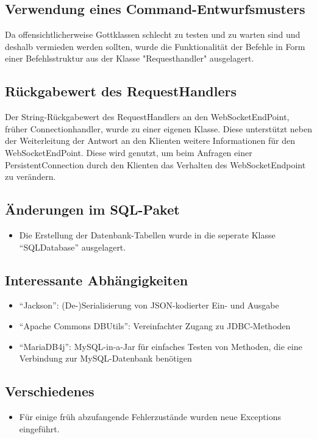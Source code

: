 \documentclass[parskip=full,11pt]{scrartcl}
\begin{document}
\subsection{Verwendung eines Command-Entwurfsmusters}
Da offensichtlicherweise Gottklassen schlecht zu testen und zu warten sind und
deshalb vermieden werden sollten, wurde die Funktionalität der Befehle in Form
einer Befehlsstruktur aus der Klasse "Requesthandler" ausgelagert.

\subsection{Rückgabewert des RequestHandlers}
Der String-Rückgabewert des RequestHandlers an den WebSocketEndPoint, früher
Connectionhandler, wurde zu einer eigenen Klasse. Diese unterstützt neben der
Weiterleitung der Antwort an den Klienten weitere Informationen für den
WebSocketEndPoint. Diese wird genutzt, um beim Anfragen einer
PersistentConnection durch den Klienten das Verhalten des WebSocketEndpoint zu
verändern.

\subsection{Änderungen im SQL-Paket}
	\begin{itemize}
		\item Die Erstellung der Datenbank-Tabellen wurde in die seperate
			Klasse \enquote{SQLDatabase} ausgelagert.
	\end{itemize}

\subsection{Interessante Abhängigkeiten}
	\begin{itemize}
		\item \enquote{Jackson}:
			(De-)Serialisierung von JSON-kodierter Ein- und Ausgabe
		\item \enquote{Apache Commons DBUtils}:
			Vereinfachter Zugang zu JDBC-Methoden
		\item \enquote{MariaDB4j}:
			MySQL-in-a-Jar für einfaches Testen von Methoden, die eine
			Verbindung zur MySQL-Datenbank benötigen
	\end{itemize}

\subsection{Verschiedenes}
	\begin{itemize}
	\item Für einige früh abzufangende Fehlerzustände wurden neue Exceptions
		eingeführt.
	\end{itemize}
\end{document}
